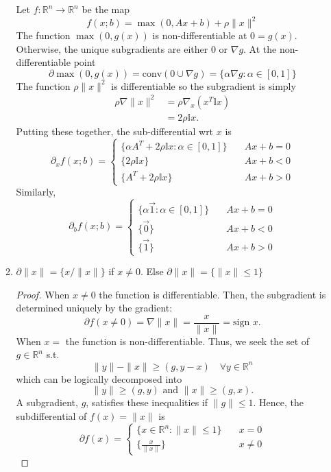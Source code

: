 \documentclass[12pt]{article}
\begin{document}
\begin{enumerate}
\begin{enumerate}
        Let $f:\mathbb R^n\to\mathbb R^n$ be the map 
        $$
        f(x; b)=\max(0, Ax+b)+\rho\|x\|^2
        $$
        The function $\max (0, g(x))$ is non-differentiable at $0= g(x)$. Otherwise, the unique subgradients are either $0$ or $\nabla g$. At the non-differentiable point
        $$
        \partial\max(0, g(x)) =\text{conv} (0\cup \nabla g)=\{\alpha \nabla g:\alpha\in[0,1]\}
        $$
        The function $\rho\|x\|^2$ is differentiable so the subgradient is simply 
        \begin{align*}
            \rho \nabla \|x\|^2&=\rho\nabla_x (x^T\mathbb I x)\\
            &=2\rho\mathbb I x.
        \end{align*}
        Putting these together, the sub-differential wrt $x$ is
        $$
        \partial_x f(x;b) =\left\{ \begin{array}{ll}
            \{\alpha A^T+2\rho\mathbb I x:\alpha\in[0, 1]\} &\quad Ax+b=0\\
           \{2\rho \mathbb I x\} &\quad Ax+b< 0\\
           \{A^T+2\rho\mathbb I x\} &\quad Ax+b>0 
       \end{array} \right.
        $$
        Similarly,
        $$
        \partial_b f(x;b) =\left\{ \begin{array}{ll}
            \{\alpha \vec 1:\alpha\in[0, 1]\} &\quad Ax+b=0\\
           \{\vec 0\} &\quad Ax+b< 0\\
           \{\vec 1\} &\quad Ax+b>0 
       \end{array} \right.
        $$
        \item $\partial \|x\|=\{x/\|x\|\}$ if $x\neq 0$. Else $\partial \|x\|=\{\|x\|\leq 1\}$
    \begin{proof}
        When $x\neq 0 $ the function is differentiable. Then, the subgradient is determined uniquely by the gradient:
        $$
        \partial f(x\neq 0)=\nabla \|x\| = \frac{x}{\|x\|}= \text{sign }x.
        $$
        When $x=$ the function is non-differentiable. Thus, we seek the set of $g\in\mathbb R^n$ s.t.
        $$
        \|y\|-\|x\|\geq ( g, y-x)\quad \forall y\in\mathbb R^n
        $$
        which can be logically decomposed into
        $$
        \|y\|\geq (g,y)\text{ and }\|x\|\geq (g,x).
        $$
        A subgradient, $g$, satisfies these inequalities if $\|g\|\leq 1$. Hence,
        the subdifferential of $f(x) = \|x\|$ is
        $$
        \partial f(x) =\left\{ \begin{array}{ll}
             \{x\in\mathbb R^n:\|x\|\leq 1\} &\quad x=0\\
            \{\frac{x}{\|x\|}\} &\quad x\neq 0 
        \end{array} \right.
        $$
        
    \end{proof}
    \end{enumerate}
\end{enumerate}
\end{document}
